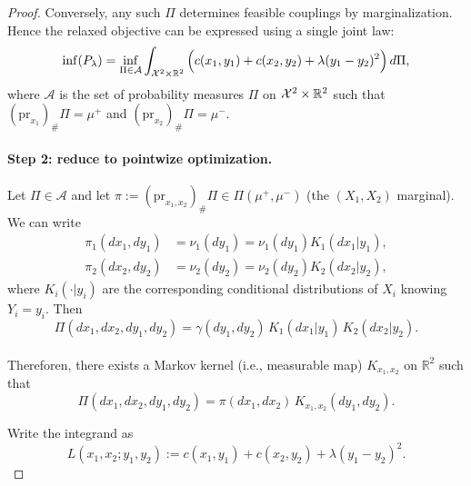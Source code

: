 \documentclass[11pt]{article}
\begin{document}
\begin{proof}
Conversely, any such $\Pi$ determines feasible couplings by marginalization. Hence the relaxed objective can be
expressed using a single joint law:
\begin{equation}\label{eq:Pi-form}
\inf(P_\lambda)
=
\inf_{\Pi\in\mathcal A}
\int_{\mathcal X^2\times \mathbb{R}^2}
\Big(
c(x_1,y_1)+c(x_2,y_2)+\lambda (y_1-y_2)^2
\Big)\,d\Pi,
\end{equation}
where $\mathcal A$ is the set of probability measures $\Pi$ on $\mathcal X^2\times\mathbb{R}^2$ such that
$(\mathrm{pr}_{x_1})_\#\Pi=\mu^+$ and $(\mathrm{pr}_{x_2})_\#\Pi=\mu^-$.


\paragraph{Step 2: reduce to pointwize optimization.}
Let $\Pi\in\mathcal A$ and let $\pi:=(\mathrm{pr}_{x_1,x_2})_\#\Pi\in\Pi(\mu^+,\mu^-)$ (the $(X_1, X_2)$ marginal).
We can write 
\begin{align*}
  \pi_1(dx_1,dy_1) &= \nu_1(dy_1) = \nu_1(dy_1)K_1(dx_1|y_1),\\
  \pi_2(dx_2,dy_2) &= \nu_2(dy_2) = \nu_2(dy_2)K_2(dx_2|y_2),
\end{align*}
where $K_i(\cdot|y_i)$ are the corresponding conditional distributions of $X_i$ knowing $Y_i= y_i$.
Then 
\begin{equation*}
  \Pi(dx_1,dx_2,dy_1,dy_2)
  = \gamma(dy_1, dy_2)\,K_1(dx_1|y_1)\,K_2(dx_2|y_2).
\end{equation*}
\\
Thereforen, there exists a Markov kernel (i.e., measurable map) $K_{x_1,x_2}$ on $\mathbb R^2$ such that
\begin{equation*}
  \Pi(dx_1,dx_2,dy_1,dy_2)=\pi(dx_1,dx_2)\,K_{x_1,x_2}(dy_1,dy_2).
\end{equation*}

Write the integrand as
\begin{equation*}
  L(x_1,x_2;y_1,y_2):=
c(x_1,y_1)+c(x_2,y_2)+\lambda (y_1-y_2)^2.
\end{equation*}


\end{proof}
\end{document}
